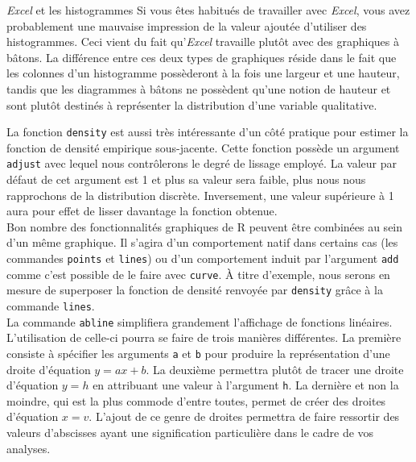 \begin{moreInfo}{\emph{Excel} et les histogrammes}
	Si vous êtes habitués de travailler avec \emph{Excel}, vous avez probablement une mauvaise impression de la valeur ajoutée d'utiliser des histogrammes. Ceci vient du fait qu’\emph{Excel} travaille plutôt avec des graphiques à bâtons. La différence entre ces deux types de graphiques réside dans le fait que les colonnes d'un histogramme possèderont à la fois une largeur et une hauteur, tandis que les diagrammes à bâtons ne possèdent qu'une notion de hauteur et sont plutôt destinés à représenter la distribution d'une variable qualitative. 
\end{moreInfo}

La fonction \texttt{density} \cite{Rfunction:density} est aussi très intéressante d'un côté pratique pour estimer la fonction de densité empirique sous-jacente. Cette fonction possède un argument \texttt{adjust} avec lequel nous contrôlerons le degré de lissage employé. La valeur par défaut de cet argument est 1 et plus sa valeur sera faible, plus nous nous rapprochons de la distribution discrète. Inversement, une valeur supérieure à 1 aura pour effet de lisser davantage la fonction obtenue. \\

Bon nombre des fonctionnalités graphiques de R peuvent être combinées au sein d'un même graphique. Il s'agira d'un comportement natif dans certains cas (les commandes \texttt{points} et \texttt{lines}) ou d'un comportement induit par l'argument \texttt{add} comme c'est possible de le faire avec \texttt{curve}. À titre d'exemple, nous serons en mesure de superposer la fonction de densité renvoyée par \texttt{density} grâce à la commande \texttt{lines}.\\
 
La commande \texttt{abline} \cite{Rfunction:abline} simplifiera grandement l'affichage de fonctions linéaires. L'utilisation de celle-ci pourra se faire de trois manières différentes. La première consiste à spécifier les arguments \texttt{a} et \texttt{b} pour produire la représentation d'une droite d'équation $y = ax + b$. La deuxième permettra plutôt de tracer une droite d'équation $y = h$ en attribuant une valeur à l'argument \texttt{h}. La dernière et non la moindre, qui est la plus commode d'entre toutes, permet de créer des droites d'équation $x = v$. L'ajout de ce genre de droites permettra de faire ressortir des valeurs d'abscisses ayant une signification particulière dans le cadre de vos analyses. \\


